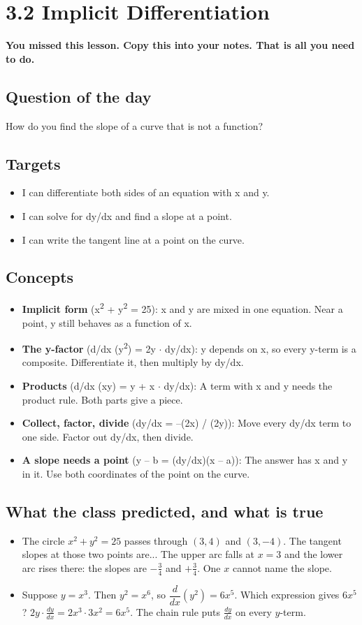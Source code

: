 \documentclass[11pt]{article}
\begin{document}
\section*{3.2 Implicit Differentiation}
\textbf{You missed this lesson. Copy this into your notes. That is all you need to do.}\par\medskip
\subsection*{Question of the day}
How do you find the slope of a curve that is not a function?\par
\subsection*{Targets}\begin{itemize}\item I can differentiate both sides of an equation with x and y.
\item I can solve for dy/dx and find a slope at a point.
\item I can write the tangent line at a point on the curve.\end{itemize}
\subsection*{Concepts}\begin{itemize}
\item \textbf{Implicit form} (x\textsuperscript{2} + y\textsuperscript{2} = 25): x and y are mixed in one equation. Near a point, y still behaves as a function of x.
\item \textbf{The y-factor} (d/dx (y\textsuperscript{2}) = 2y $\cdot$ dy/dx): y depends on x, so every y-term is a composite. Differentiate it, then multiply by dy/dx.
\item \textbf{Products} (d/dx (xy) = y + x $\cdot$ dy/dx): A term with x and y needs the product rule. Both parts give a piece.
\item \textbf{Collect, factor, divide} (dy/dx = --(2x) / (2y)): Move every dy/dx term to one side. Factor out dy/dx, then divide.
\item \textbf{A slope needs a point} (y -- b = (dy/dx)(x -- a)): The answer has x and y in it. Use both coordinates of the point on the curve.
\end{itemize}
\subsection*{What the class predicted, and what is true}\begin{itemize}
\item The circle $x^2+y^2=25$ passes through $(3,4)$ and $(3,-4)$. The tangent slopes at those two points are...  The upper arc falls at $x=3$ and the lower arc rises there: the slopes are $-\tfrac34$ and $+\tfrac34$. One $x$ cannot name the slope.
\item Suppose $y=x^3$. Then $y^2=x^6$, so $\dfrac{d}{dx}(y^2)=6x^5$. Which expression gives $6x^5$?  $2y\cdot\frac{dy}{dx}=2x^3\cdot3x^2=6x^5$. The chain rule puts $\frac{dy}{dx}$ on every $y$-term.
\end{itemize}
\end{document}
